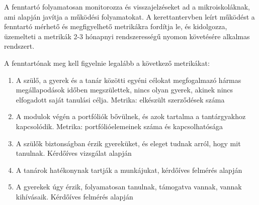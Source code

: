 A fenntartó folyamatosan monitorozza és visszajelzéseket ad a mikroiskoláknak,
ami alapján javítja a működési folyamatokat. A kerettantervben leírt működést a
fenntartó mérhető és megfigyelhető metrikákra fordítja le, és kidolgozza,
üzemelteti a metrikák 2-3 hónapnyi rendszerességű nyomon követésére alkalmas
rendszert.

A fenntartónak meg kell figyelnie legalább a következő metrikákat:
\begin{enumerate}
  \item A szülő, a gyerek és a tanár közötti egyéni célokat megfogalmazó hármas
        megállapodások időben megszülettek, nincs olyan gyerek, akinek nincs elfogadott
        saját tanulási célja. Metrika: elkészült szerződések száma

  \item A modulok végén a portfóliók bővülnek, és azok tartalma a tantárgyakhoz
        kapcsolódik. Metrika: portfólióelemeinek száma és kapcsolhatósága

  \item A szülők biztonságban érzik gyereküket, és eleget tudnak arról, hogy mit
        tanulnak. Kérdőíves vizsgálat alapján

  \item A tanárok hatékonynak tartják a munkájukat, kérdőíves felmérés alapján

  \item A gyerekek úgy érzik, folyamatosan tanulnak, támogatva vannak, vannak
        kihívásaik. Kérdőíves felmérés alapján
\end{enumerate}

